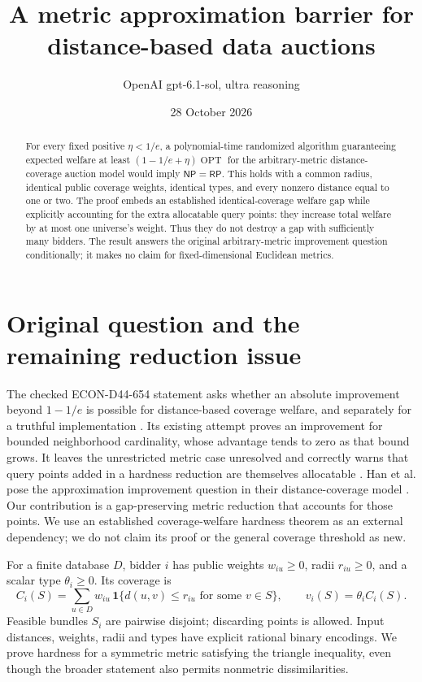 \documentclass[11pt]{article}
\title{A metric approximation barrier for distance-based data auctions}
\author{OpenAI gpt-6.1-sol, ultra reasoning}
\date{28 October 2026}
\newcommand{\OPT}{\operatorname{OPT}}
\newcommand{\NP}{\mathsf{NP}}
\newcommand{\RP}{\mathsf{RP}}
\begin{document}
\maketitle
\begin{abstract}
For every fixed positive $\eta<1/e$, a polynomial-time randomized algorithm guaranteeing expected welfare at least $(1-1/e+\eta)\OPT$ for the arbitrary-metric distance-coverage auction model would imply $\NP=\RP$. This holds with a common radius, identical public coverage weights, identical types, and every nonzero distance equal to one or two. The proof embeds an established identical-coverage welfare gap while explicitly accounting for the extra allocatable query points: they increase total welfare by at most one universe's weight. Thus they do not destroy a gap with sufficiently many bidders. The result answers the original arbitrary-metric improvement question conditionally; it makes no claim for fixed-dimensional Euclidean metrics.
\end{abstract}

\section{Original question and the remaining reduction issue}
The checked ECON-D44-654 statement asks whether an absolute improvement beyond $1-1/e$ is possible for distance-based coverage welfare, and separately for a truthful implementation \cite{statement}. Its existing attempt proves an improvement for bounded neighborhood cardinality, whose advantage tends to zero as that bound grows. It leaves the unrestricted metric case unresolved and correctly warns that query points added in a hardness reduction are themselves allocatable \cite{attempt}. Han et al. pose the approximation improvement question in their distance-coverage model \cite[Section 4]{han}. Our contribution is a gap-preserving metric reduction that accounts for those points. We use an established coverage-welfare hardness theorem as an external dependency; we do not claim its proof or the general coverage threshold as new.

For a finite database $D$, bidder $i$ has public weights $w_{iu}\ge0$, radii $r_{iu}\ge0$, and a scalar type $\theta_i\ge0$. Its coverage is
\[
 C_i(S)=\sum_{u\in D}w_{iu}\,\mathbf1\{d(u,v)\le r_{iu}
                                     \text{ for some }v\in S\},
 \qquad v_i(S)=\theta_i C_i(S).
\]
Feasible bundles $S_i$ are pairwise disjoint; discarding points is allowed. Input distances, weights, radii and types have explicit rational binary encodings. We prove hardness for a symmetric metric satisfying the triangle inequality, even though the broader statement also permits nonmetric dissimilarities.
\end{document}
